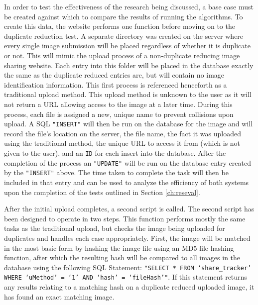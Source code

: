 In order to test the effectiveness of the research being discussed, a base case must be created against which to compare the results of running the algorithms. To create this data, the website performs one function before moving on to the duplicate reduction test. A separate directory was created on the server where every single image submission will be placed regardless of whether it is duplicate or not. This will mimic the upload process of a non-duplicate reducing image sharing website. Each entry into this folder will be placed in the database exactly the same as the duplicate reduced entries are, but will contain no image identification information. This first process is referenced henceforth as a traditional upload method. This upload method is unknown to the user as it will not return a URL allowing access to the image at a later time. During this process, each file is assigned a new, unique name to prevent collisions upon upload. A SQL {\tt "INSERT"} will then be run on the database for the image and will record the file's location on the server, the file name, the fact it was uploaded using the traditional method, the unique URL to access it from (which is not given to the user), and an {\tt ID} for each insert into the database. After the completion of the process an {\tt "UPDATE"} will be run on the database entry created by the {\tt "INSERT"} above. The time taken to complete the task will then be included in that entry and can be used to analyze the efficiency of both systems upon the completion of the tests outlined in Section \ref{ch:reseval}.

After the initial upload completes, a second script is called. The second script has been designed to operate in two steps. This function performs mostly the same tasks as the traditional upload, but checks the image being uploaded for duplicates and handles each case appropriately. First, the image will be matched in the most basic form by hashing the image file using an MD5 file hashing function, after which the resulting hash will be compared to all images in the database using the following SQL Statement: {\tt "SELECT * FROM `share\_tracker' WHERE `uMethod' = `1' AND `hash' = `fileHash'"}. If this statement returns any results relating to a matching hash on a duplicate reduced uploaded image, it has found an exact matching image. 

